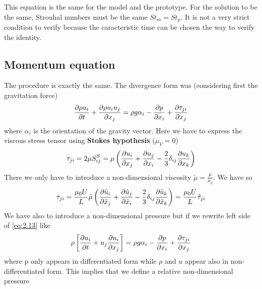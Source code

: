 		\begin{center}
		\end{center}
		This equation is the same for the model and the prototype. For the solution to be the same, Strouhal numbers must be the same $St_m = St_p$. It is not a very strict  condition to verify because the caracteristic time can be chosen the way to verify the identity. 
		
	\subsection{Momentum equation}
		The procedure is exactly the same. The divergence form was (considering first the gravitation force)
		\begin{equation}
			\frac{\partial \rho u_i}{\partial t} + \frac{\partial \rho u_i u_j}{\partial x_j} = \rho g \alpha _i - \frac{\partial p}{\partial x_i} + \frac{\partial \tau _{ji}}{\partial x_j}
			\label{eq:2.13}
		\end{equation}
		where $\alpha _i$ is the orientation of the gravity vector. Here we have to express the viscous stress tensor using \textbf{Stokes hypothesis} ($\mu _V = 0$)
		\begin{equation}
			\tau _{ji}= 2\mu S_{ij}^S = \mu \left( \frac{\partial u_i}{\partial x_j}+ \frac{\partial u_j}{\partial x_i} - \frac{2}{3} \delta _{ij} \frac{\partial u_k}{\partial x_k} \right)
		\end{equation}
		There we only have to introduce a non-dimensional viscosity $\tilde{\mu} = \frac{\mu}{\mu _0}$. We have so 
		\begin{equation}
			\tau _{ji}= \frac{\mu _0 U}{L}\tilde{\mu} \left( \frac{\partial \tilde{u}_i}{\partial \tilde{x}_j}+ \frac{\partial \tilde{u}_j}{\partial \tilde{x}_i} - \frac{2}{3} \delta _{ij} \frac{\partial \tilde{u}_k}{\partial \tilde{x}_k} \right)
			= \frac{\mu _0 U}{L} \tilde{\tau} _{ji}
		\end{equation}
		We have also to introduce a non-dimensional pressure but if we rewrite left side of \eqref{eq:2.13} like 
		\begin{equation}
			\rho \left[ \frac{\partial u_i}{\partial t} + u_j \frac{\partial u_i}{\partial x_j} \right] = \rho g \alpha _i - \frac{\partial p}{\partial x_i} + \frac{\partial \tau _{ji}}{\partial x_j}
		\end{equation}
		where p only appears in differentiated form while $\rho$ and $u$ appear also in non-differentiated form. This implies that we define a relative non-dimensional pressure 
